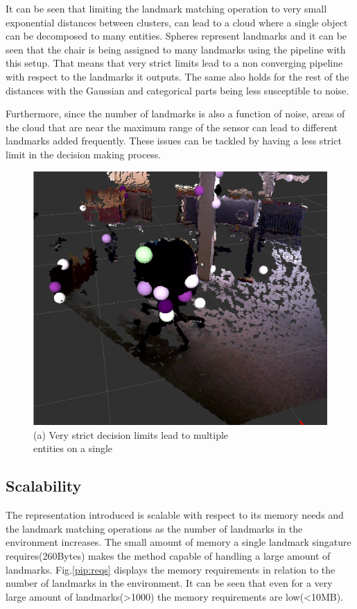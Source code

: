 \documentclass[twoside,hidelinks]{article}
\begin{document}
It can be seen that limiting the landmark matching operation to very small exponential distances between clusters, can lead to a cloud where a single object can be decomposed to many entities. Spheres represent landmarks and it can be seen that the chair is being assigned to many landmarks using the pipeline with this setup. That means that very strict limits lead to a non converging pipeline with respect to the landmarks it outputs. The same also holds for the rest of the distances with the Gaussian and categorical parts being less susceptible to noise. 

Furthermore, since the number of landmarks is also a function of noise, areas of the cloud that are near the maximum range of the sensor can lead to different landmarks added frequently. These issues can be tackled by having a less strict limit in the decision making process.

\begin{figure}[!ht]
        \centering
	    \includegraphics[width=.5\textwidth]{monsterchair} \\
	  (a) Very strict decision limits lead to multiple \\
	   entities on a single \\[6pt]
	  \label{pip:expo}
\end{figure}

\subsection{Scalability}

The representation introduced is scalable with respect to its memory needs and the landmark matching operations as the number of landmarks in the environment increases.
The small amount of memory a single landmark singature requires(260Bytes) makes the method capable of handling a large amount of landmarks. Fig.\ref{pip:reqs} displays the memory requirements in relation to the number of landmarks in the environment. It can be seen that even for a very large amount of landmarks(>1000) the memory requirements are low(<10MB).
\end{document}
